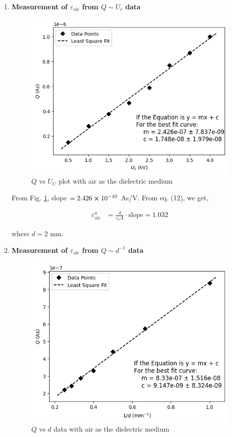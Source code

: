     \begin{enumerate}
        \item \textbf{Measurement of $\varepsilon_\text{air}$ from $Q \sim U_c$ data}
            \begin{figure}[H]
                \centering
                \includegraphics[width=0.8\columnwidth]{images/g1.png}
                \caption{$Q$ vs $U_C$ plot with air as the dielectric medium}
                \label{g1}
            \end{figure}

            From Fig. \ref{g1}, slope $=2.426 \cross 10^{-10}$ As/V. From eq. (12), we get,
                
            \begin{align*}
                \varepsilon_\text{air}^{a} &= \frac{d}{\varepsilon_oA} \cdot \text{slope}=1.032
            \end{align*}
            
            where $d=2$ mm.\\

        \item \textbf{Measurement of $\varepsilon_\text{air}$ from $Q \sim d^{-1}$ data}
            \begin{figure}[H]
                \centering
                \includegraphics[width=0.8\columnwidth]{images/g2.png}
                \caption{$Q$ vs $d$ data with air as the dielectric medium}
                \label{g2}
            \end{figure}


\end{enumerate}
